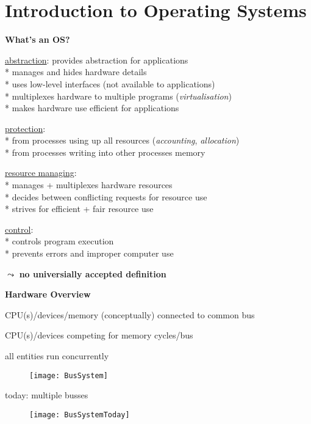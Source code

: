 \section{Introduction to Operating Systems}

\textbf{What's an OS?}
\begin{items}
	\item \underline{abstraction}: provides abstraction for applications \\*
		manages and hides hardware details \\*
		uses low-level interfaces (not available to applications) \\*
		multiplexes hardware to multiple programs (\emph{virtualisation}) \\*
		makes hardware use efficient for applications
	\item \underline{protection}: \\*
		from processes using up all resources (\emph{accounting}, \emph{allocation}) \\*
		from processes writing into other processes memory
	\item \underline{resource managing}: \\*
		manages + multiplexes hardware resources \\*
		decides between conflicting requests for resource use \\*
		strives for efficient + fair resource use
	\item \underline{control}: \\*
		controls program execution \\*
		prevents errors and improper computer use
	\item \( \leadsto \) \textbf{no universially accepted definition}
\end{items}

\textbf{Hardware Overview}
\begin{items}
	\item CPU(s)/devices/memory (conceptually) connected to common bus
	\item CPU(s)/devices competing for memory cycles/bus
	\item all entities run concurrently
	\begin{figure}[H]\centering\label{BusSystem}\texttt{[image: BusSystem]}\end{figure}
	\item today: multiple busses
	\begin{figure}[H]\centering\label{BusSystemToday}\texttt{[image: BusSystemToday]}\end{figure}
\end{items}

